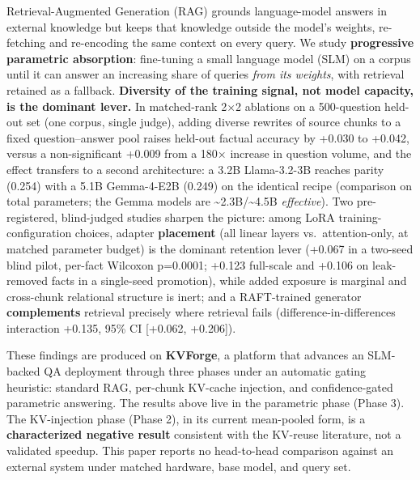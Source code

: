 Retrieval-Augmented Generation (RAG) grounds language-model answers in external knowledge but keeps that knowledge outside the model's weights, re-fetching and re-encoding the same context on every query. We study \textbf{progressive parametric absorption}: fine-tuning a small language model (SLM) on a corpus until it can answer an increasing share of queries \emph{from its weights}, with retrieval retained as a fallback. \textbf{Diversity of the training signal, not model capacity, is the dominant lever.} In matched-rank 2×2 ablations on a 500-question held-out set (one corpus, single judge), adding diverse rewrites of source chunks to a fixed question--answer pool raises held-out factual accuracy by +0.030 to +0.042, versus a non-significant +0.009 from a 180× increase in question volume, and the effect transfers to a second architecture: a 3.2B Llama-3.2-3B reaches parity (0.254) with a 5.1B Gemma-4-E2B (0.249) on the identical recipe (comparison on total parameters; the Gemma models are \textasciitilde2.3B/\textasciitilde4.5B \emph{effective}). Two pre-registered, blind-judged studies sharpen the picture: among LoRA training-configuration choices, adapter \textbf{placement} (all linear layers vs.~attention-only, at matched parameter budget) is the dominant retention lever (+0.067 in a two-seed blind pilot, per-fact Wilcoxon p=0.0001; +0.123 full-scale and +0.106 on leak-removed facts in a single-seed promotion), while added exposure is marginal and cross-chunk relational structure is inert; and a RAFT-trained generator \textbf{complements} retrieval precisely where retrieval fails (difference-in-differences interaction +0.135, 95\% CI {[}+0.062, +0.206{]}).

These findings are produced on \textbf{KVForge}, a platform that advances an SLM-backed QA deployment through three phases under an automatic gating heuristic: standard RAG, per-chunk KV-cache injection, and confidence-gated parametric answering. The results above live in the parametric phase (Phase 3). The KV-injection phase (Phase 2), in its current mean-pooled form, is a \textbf{characterized negative result} consistent with the KV-reuse literature, not a validated speedup. This paper reports no head-to-head comparison against an external system under matched hardware, base model, and query set.
